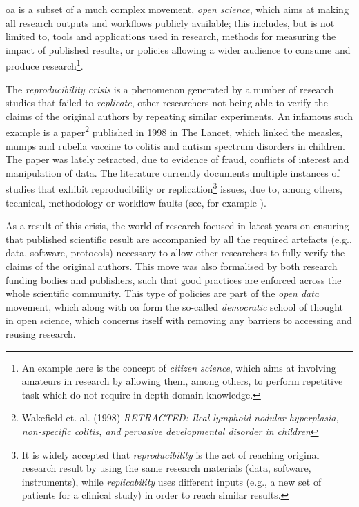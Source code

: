 \gls{oa} is a subset of a much complex movement, \emph{open science}, which aims at making all research outputs and workflows publicly available; this includes, but is not limited to, tools and applications used in research, methods for measuring the impact of published results, or policies allowing a wider audience to consume and produce research\footnote{An example here is the concept of \emph{citizen science}, which aims at involving amateurs in research by allowing them, among others, to perform repetitive task which do not require in-depth domain knowledge.}.

The \emph{reproducibility crisis} is a phenomenon generated by a number of research studies that failed to \emph{replicate}, other researchers not being able to verify the claims of the original authors by repeating similar experiments. An infamous such example is a paper\footnote{Wakefield et. al. (1998) \emph{RETRACTED: Ileal-lymphoid-nodular hyperplasia, non-specific colitis, and pervasive developmental disorder in children}} published in 1998 in The Lancet, which linked the measles, mumps and rubella vaccine to colitis and autism spectrum disorders in children. The paper was lately retracted, due to evidence of fraud, conflicts of interest and manipulation of data. The literature currently documents multiple instances of studies that exhibit reproducibility or replication\footnote{It is widely accepted that \emph{reproducibility} is the act of reaching original research result by using the same research materials (data, software, instruments), while \emph{replicability} uses different inputs (e.g., a new set of patients for a clinical study) in order to reach similar results\cite{patil}.} issues, due to, among others, technical, methodology or workflow faults (see, for example \cite{eklund,seekblastn}).

As a result of this crisis, the world of research focused in latest years on ensuring that published scientific result are accompanied by all the required artefacts (e.g., data, software, protocols) necessary to allow other researchers to fully verify the claims of the original authors. This move was also formalised by both research funding bodies\cite{h2020,nih} and publishers\cite{scidat,elsdat}, such that good practices are enforced across the whole scientific community. This type of policies are part of the \emph{open data} movement, which along with \gls{oa} form the so-called \emph{democratic} school of thought in open science, which concerns itself with removing any barriers to accessing and reusing research.

